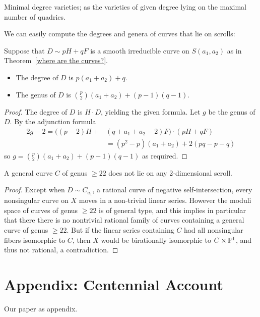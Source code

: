 \begin{exercise} 
 Minimal degree varieties; as the varieties of given degree lying on the maximal number of quadrics.
\end{exercise}
 
We can easily compute the degrees and genera of curves that lie on scrolls:

\begin{proposition}
 Suppose that $D\sim pH+qF$ is a smooth irreducible curve on $S(a_{1}, a_{2})$ as in Theorem~\ref{where are the curves?}. 
\begin{itemize}
 \item The degree of $D$ is $p(a_{1}+a_{2}) +q$.
 \item The genus of $D$ is ${p\choose 2}(a_{1}+a_{2}) + (p-1)(q-1)$.
\end{itemize}
\end{proposition}
  
\begin{proof} The degree of $D$ is $H\cdot D$, yielding the given formula. Let $g$ be the genus of $D$. 
By the adjunction formula
\begin{align*}
2g-2 =  \bigl((p-2)H+&(q+a_{1}+a_{2}-2)F\bigr)\cdot (pH+qF)\\ 
 &= (p^{2}-p)(a_{1}+a_{2})+2(pq-p-q)
\end{align*}
so $g = {p\choose 2}(a_{1}+a_{2}) + (p-1)(q-1)$ as required.
\end{proof}

\begin{fact}
A general curve $C$ of  genus $\geq 22$ does not lie on any 2-dimensional scroll.
\end{fact}
\begin{proof}
Except when $D\sim C_{a_{1}}$, a rational curve of negative self-intersection, every nonsingular curve on $X$ moves in a non-trivial linear series. However the moduli space of curves of genus $\geq 22$ is of general type, and this implies in particular that there there is no nontrivial rational family of curves containing a general curve of 
genus $\geq 22$. But if the linear series containing $C$ had all nonsingular fibers isomorphic to $C$, then
$X$ would be birationally isomorphic to $C\times \PP^{1}$, and thus not rational, a contradiction.
\end{proof}

\section{Appendix: Centennial Account}
Our paper as appendix.





